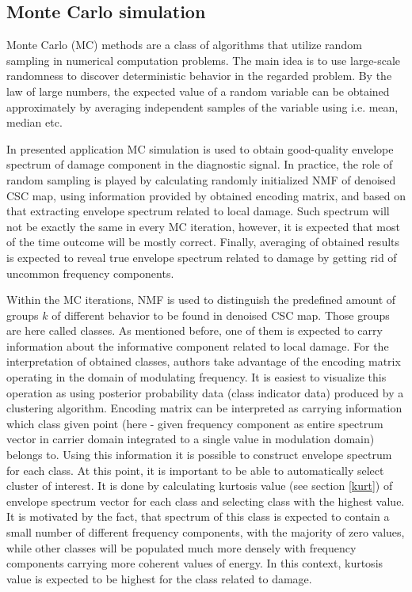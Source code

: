 \documentclass[3p, 12pt]{elsarticle} %
\begin{document}

\subsection{Monte Carlo simulation}\label{mcmc}

Monte Carlo (MC) methods are a class of algorithms that utilize random sampling in numerical computation problems. The main idea is to use large-scale randomness to discover deterministic behavior in the regarded problem. By the law of large numbers, the expected value of a random variable can be obtained approximately by averaging independent samples of the variable using i.e. mean, median etc. 

In presented application MC simulation is used to obtain good-quality envelope spectrum of damage component in the diagnostic signal. In practice, the role of random sampling is played by calculating randomly initialized NMF of denoised CSC map, using information provided by obtained encoding matrix, and based on that extracting envelope spectrum related to local damage. Such spectrum will not be exactly the same in every MC iteration, however, it is expected that most of the time outcome will be mostly correct. Finally, averaging of obtained results is expected to reveal true envelope spectrum related to damage by getting rid of uncommon frequency components.

Within the MC iterations, NMF is used to distinguish the predefined amount of groups $k$ of different behavior to be found in denoised CSC map. Those groups are here called classes. As mentioned before, one of them is expected to carry information about the informative component related to local damage. For the interpretation of obtained classes, authors take advantage of the encoding matrix operating in the domain of modulating frequency. It is easiest to visualize this operation as using posterior probability data (class indicator data) produced by a clustering algorithm. Encoding matrix can be interpreted as carrying information which class given point (here - given frequency component as entire spectrum vector in carrier domain integrated to a single value in modulation domain) belongs to. Using this information it is possible to construct envelope spectrum for each class. At this point, it is important to be able to automatically select cluster of interest. It is done by calculating kurtosis value (see section \ref{kurt}) of envelope spectrum vector for each class and selecting class with the highest value. It is motivated by the fact, that spectrum of this class is expected to contain a small number of different frequency components, with the majority of zero values, while other classes will be populated much more densely with frequency components carrying more coherent values of energy. In this context, kurtosis value is expected to be highest for the class related to damage.
\end{document}
